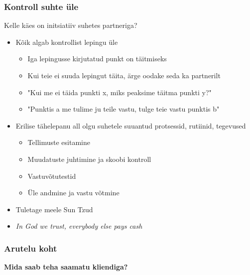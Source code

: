 \begin{frame}[fragile]
  \frametitle{Kontroll suhte üle}
  	Kelle käes on initsiatiiv suhetes partneriga?
	\begin{itemize}
		\item Kõik algab kontrollist lepingu üle
		\begin{itemize}
			\item Iga lepingusse kirjutatud punkt on täitmiseks
			\item Kui teie ei suuda lepingut täita, ärge oodake seda ka partnerilt
			\item "Kui me ei täida punkti x, miks peaksime täitma punkti y?"
			\item "Punktis a me tulime ju teile vastu, tulge teie vastu punktis b"
		\end{itemize}
		\item Erilise tähelepanu all olgu suhetele suuantud protsessid, rutiinid, tegevused
		\begin{itemize}
			\item Tellimuste esitamine
			\item Muudatuste juhtimine ja skoobi kontroll
			\item Vastuvõtutestid
			\item Üle andmine ja vastu võtmine
		\end{itemize}
		\item Tuletage meele Sun Tzud
		\item \emph{In God we trust, everybody else pays cash}
	\end{itemize}
\end{frame}

\begin{frame}[fragile]
  \frametitle{Arutelu koht}
		\begin{center}
			\textbf{Mida saab teha saamatu kliendiga?}
		\end{center}
\end{frame}

